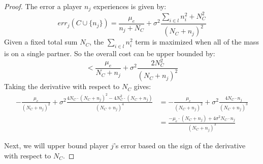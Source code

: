 \documentclass{article}
\newcommand{\cd}[0]{\cdot}
\newcommand{\mue}[0]{\ensuremath{\mu_e}}
\newcommand{\var}[0]{\ensuremath{\sigma^2}}
\newcommand{\ndraw}[0]{\ensuremath{n}}
\newcommand{\total}[0]{\ensuremath{N}}
\newcommand{\col}[0]{\ensuremath{C}}
\begin{document}
\begin{proof}
The error a player $\ndraw_j$ experiences is given by: 
$$err_j(\col \cup \{\ndraw_j\}) = \frac{\mue}{\ndraw_j + \total_{\col}} + \var \frac{\sum_{i \in l} \ndraw_i^2 + \total_{\col}^2}{(\total_{\col} + \ndraw_j)^2}$$
Given a fixed total sum $\total_{\col}$, the $\sum_{i \in l} \ndraw_i^2$ term is maximized when all of the mass is on a single partner. So the overall cost can be upper bounded by: 
$$<\frac{\mue}{\total_{\col} + \ndraw_j} + \var \frac{2\total_{\col}^2}{(\total_{\col} + \ndraw_j)^2}$$
Taking the derivative with respect to $\total_{\col}$ gives: 
\begin{align*}
 -\frac{\mue}{(\total_{\col} +\ndraw_j)^2} + \var \frac{4 \total_{\col} \cd (\total_{\col} + \ndraw_j)^2 - 4 \total_{\col}^2 \cd (\total_{\col} + \ndraw_j)}{(\total_{\col} + \ndraw_j)^4}&=-\frac{\mue}{(\total_{\col} +\ndraw_j)^2} + \var \frac{4 \total_{\col} \cd \ndraw_j}{(\total_{\col} + \ndraw_j)^3} \\
&= \frac{- \mue \cd (\total_{\col} + \ndraw_j)+ 4\var  \total_{\col} \cd \ndraw_j}{(\total_{\col} + \ndraw_j)^3}
\end{align*}

Next, we will upper bound player $j$'s error based on the sign of the derivative with respect to $\total_{\col}$. 


\end{proof}
\end{document}
